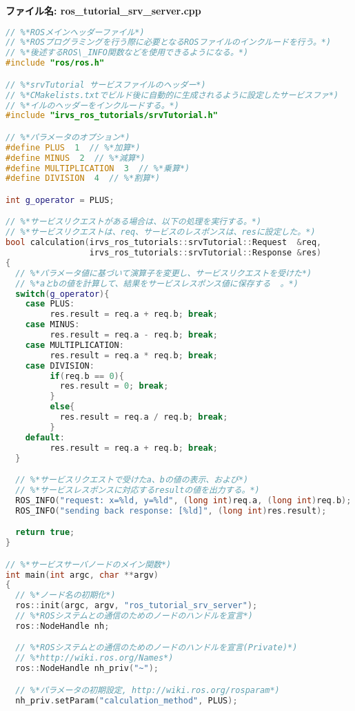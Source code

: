 \noindent\textbf{ファイル名: ros\_tutorial\_srv\_server.cpp}
\begin{lstlisting}[language=C++]
// %*ROSメインヘッダーファイル*)
// %*ROSプログラミングを行う際に必要となるROSファイルのインクルードを行う。*)
// %*後述するROS\_INFO関数などを使用できるようになる。*)
#include "ros/ros.h"

// %*srvTutorial サービスファイルのヘッダー*)
// %*CMakelists.txtでビルド後に自動的に生成されるように設定したサービスファ*)
// %*イルのヘッダーをインクルードする。*)
#include "irvs_ros_tutorials/srvTutorial.h"

// %*パラメータのオプション*)
#define PLUS  1  // %*加算*)
#define MINUS  2  // %*減算*)
#define MULTIPLICATION  3  // %*乗算*)
#define DIVISION  4  // %*割算*)

int g_operator = PLUS;

// %*サービスリクエストがある場合は、以下の処理を実行する。*)
// %*サービスリクエストは、req、サービスのレスポンスは、resに設定した。*)
bool calculation(irvs_ros_tutorials::srvTutorial::Request  &req,
                 irvs_ros_tutorials::srvTutorial::Response &res)
{
  // %*パラメータ値に基づいて演算子を変更し、サービスリクエストを受けた*)
  // %*aとbの値を計算して、結果をサービスレスポンス値に保存する  。*)
  switch(g_operator){
    case PLUS:
         res.result = req.a + req.b; break;
    case MINUS:
         res.result = req.a - req.b; break;
    case MULTIPLICATION:
         res.result = req.a * req.b; break;
    case DIVISION:
         if(req.b == 0){
           res.result = 0; break;
         }
         else{
           res.result = req.a / req.b; break;
         }
    default:
         res.result = req.a + req.b; break;
  }

  // %*サービスリクエストで受けたa、bの値の表示、および*)
  // %*サービスレスポンスに対応するresultの値を出力する。*)
  ROS_INFO("request: x=%ld, y=%ld", (long int)req.a, (long int)req.b);
  ROS_INFO("sending back response: [%ld]", (long int)res.result);

  return true;
}

// %*サービスサーバノードのメイン関数*)
int main(int argc, char **argv)
{
  // %*ノード名の初期化*)
  ros::init(argc, argv, "ros_tutorial_srv_server");
  // %*ROSシステムとの通信のためのノードのハンドルを宣言*)
  ros::NodeHandle nh;

  // %*ROSシステムとの通信のためのノードのハンドルを宣言(Private)*)
  // %*http://wiki.ros.org/Names*)
  ros::NodeHandle nh_priv("~");

  // %*パラメータの初期設定, http://wiki.ros.org/rosparam*)
  nh_priv.setParam("calculation_method", PLUS);


\end{lstlisting}
